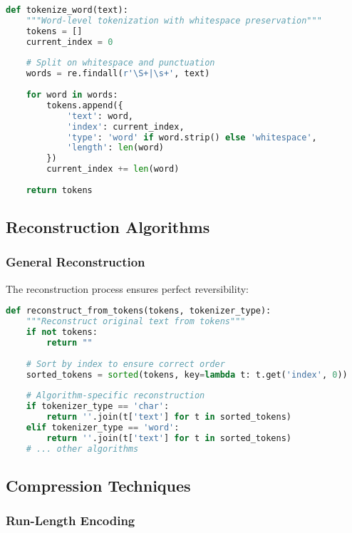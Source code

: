 \documentclass[conference]{IEEEtran}
\begin{document}
\begin{lstlisting}[language=Python, caption=Word Tokenization Algorithm]
def tokenize_word(text):
    """Word-level tokenization with whitespace preservation"""
    tokens = []
    current_index = 0
    
    # Split on whitespace and punctuation
    words = re.findall(r'\S+|\s+', text)
    
    for word in words:
        tokens.append({
            'text': word,
            'index': current_index,
            'type': 'word' if word.strip() else 'whitespace',
            'length': len(word)
        })
        current_index += len(word)
    
    return tokens
\end{lstlisting}

\subsection{Reconstruction Algorithms}

\subsubsection{General Reconstruction}

The reconstruction process ensures perfect reversibility:

\begin{lstlisting}[language=Python, caption=General Reconstruction Algorithm]
def reconstruct_from_tokens(tokens, tokenizer_type):
    """Reconstruct original text from tokens"""
    if not tokens:
        return ""
    
    # Sort by index to ensure correct order
    sorted_tokens = sorted(tokens, key=lambda t: t.get('index', 0))
    
    # Algorithm-specific reconstruction
    if tokenizer_type == 'char':
        return ''.join(t['text'] for t in sorted_tokens)
    elif tokenizer_type == 'word':
        return ''.join(t['text'] for t in sorted_tokens)
    # ... other algorithms
\end{lstlisting}

\subsection{Compression Techniques}

\subsubsection{Run-Length Encoding}
\end{document}
